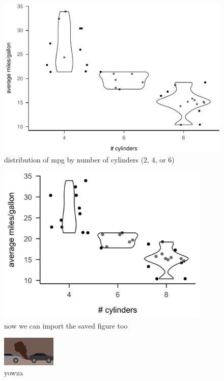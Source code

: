 \documentclass[
  english,
  man,floatsintext]{apa6}
\begin{document}
\begin{figure}
\centering
\includegraphics{example_rmd_files/figure-latex/fig-avgmpg-thmapa-1.pdf}
\caption{\label{fig:fig-avgmpg-thmapa}distribution of mpg by number of cylinders (2, 4, or 6)}
\end{figure}



\begin{figure}
\includegraphics[width=4in]{numcyls.vs.mpg} \caption{now we can import the saved figure too}\label{fig:fig-cyl-mpg}
\end{figure}



\begin{figure}
\includegraphics[width=1.01in]{smog} \caption{yowza}\label{fig:fig-smog}
\end{figure}
\end{document}
